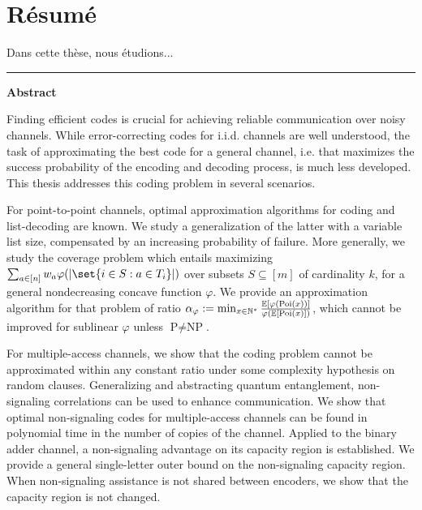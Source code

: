 \chapter*{Résumé}

\begin{otherlanguage}{french}
  Dans cette thèse, nous étudions...
\end{otherlanguage}
\clearpage 

\flushright
\bigskip
\hrule \bigskip \bigskip
{\Huge \textbf{\textsf{Abstract}}}
\flushleftright
{}
\vspace{1.5cm}

Finding efficient codes is crucial for achieving reliable communication over noisy channels. While error-correcting codes for i.i.d. channels are well understood, the task of approximating the best code for a general channel, i.e. that maximizes the success probability of the encoding and decoding process, is much less developed. This thesis addresses this coding problem in several scenarios.

For point-to-point channels, optimal approximation algorithms for coding and list-decoding are known. We study a generalization of the latter with a variable list size, compensated by an increasing probability of failure. More generally, we study the coverage problem which entails maximizing $\sum_{a \in [n]} w_a \varphi(\abs{\set{i \in S : a \in T_i}})$ over subsets $S \subseteq [m]$ of cardinality $k$, for a general nondecreasing concave function $\varphi$. We provide an approximation algorithm for that problem of ratio $\alpha_{\varphi} := \min_{x \in \mathbb{N}^*} \frac{\mathbb{E}[\varphi(\operatorname{\text{Poi}}(x))]}{\varphi(\mathbb{E}[\operatorname{\text{Poi}}(x)])}$, which cannot be improved for sublinear $\varphi$ unless $\textrm{P}\not=\textrm{NP}$.

For multiple-access channels, we show that the coding problem cannot be approximated within any constant ratio under some complexity hypothesis on random clauses. Generalizing and abstracting quantum entanglement, non-signaling correlations can be used to enhance communication. We show that optimal non-signaling codes for multiple-access channels can be found in polynomial time in the number of copies of the channel. Applied to the binary adder channel, a non-signaling advantage on its capacity region is established. We provide a general single-letter outer bound on the non-signaling capacity region. When non-signaling assistance is not shared between encoders, we show that the capacity region is not changed.

